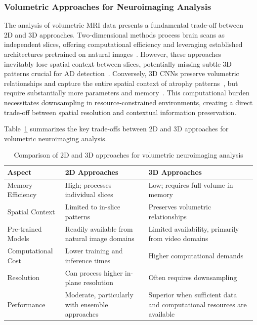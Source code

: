 \documentclass[11pt, a4paper]{article}
\begin{document}
\subsubsection{Volumetric Approaches for Neuroimaging Analysis}

The analysis of volumetric MRI data presents a fundamental trade-off between 2D and 3D approaches. Two-dimensional methods process brain scans as independent slices, offering computational efficiency and leveraging established architectures pretrained on natural images~\cite{liang2021alzheimer, sarraf2016classification}. However, these approaches inevitably lose spatial context between slices, potentially missing subtle 3D patterns crucial for AD detection~\cite{gunawardena2017applying}. Conversely, 3D CNNs preserve volumetric relationships and capture the entire spatial context of atrophy patterns~\cite{payan2015predicting}, but require substantially more parameters and memory~\cite{yang2021reinventing}. This computational burden necessitates downsampling in resource-constrained environments, creating a direct trade-off between spatial resolution and contextual information preservation.

Table~\ref{tab:2d_vs_3d} summarizes the key trade-offs between 2D and 3D approaches for volumetric neuroimaging analysis.

\begin{table}[htbp]
\centering
\begin{tabular}{|p{3cm}|p{6cm}|p{6cm}|}
\hline
\textbf{Aspect} & \textbf{2D Approaches} & \textbf{3D Approaches} \\
\hline
Memory Efficiency & High; processes individual slices & Low; requires full volume in memory \\
\hline
Spatial Context & Limited to in-slice patterns & Preserves volumetric relationships \\
\hline
Pre-trained Models & Readily available from natural image domains & Limited availability, primarily from video domains \\
\hline
Computational Cost & Lower training and inference times & Higher computational demands \\
\hline
Resolution & Can process higher in-plane resolution & Often requires downsampling \\
\hline
Performance & Moderate, particularly with ensemble approaches & Superior when sufficient data and computational resources are available \\
\hline
\end{tabular}
\caption{Comparison of 2D and 3D approaches for volumetric neuroimaging analysis}
\label{tab:2d_vs_3d}
\end{table}
\end{document}
